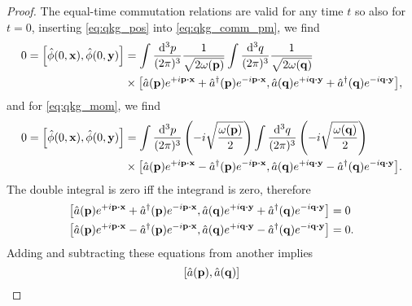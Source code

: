 \qkgcommac
\begin{proof}
	The equal-time commutation relations are valid for any time $t$ so also for $t=0$, inserting \cref{eq:qkg_pos} into \cref{eq:qkg_comm_pm}, we find
	\begin{equation*}
		\begin{split}
			0
			=
			\comm{\hat\phi(0,\vb{x})}{\hat\phi(0,\vb{y})}
			&=
			\int\frac{\dd[3]{p}}{(2\pi)^3}
			\frac{1}{\sqrt{2\omega(\vb{p})}}
			\int\frac{\dd[3]{q}}{(2\pi)^3}
			\frac{1}{\sqrt{2\omega(\vb{q})}}
			\\
			&\times
			\comm{
				\hat{a}(\vb{p})
				e^{+i\vb{p}\vdot\vb{x}}
				+
				\hat{a}^\dagger(\vb{p})
				e^{-i\vb{p}\vdot\vb{x}}
			}{
				\hat{a}(\vb{q})
				e^{+i\vb{q}\vdot\vb{y}}
				+
				\hat{a}^\dagger(\vb{q})
				e^{-i\vb{q}\vdot\vb{y}}
			}
			,
		\end{split}
	\end{equation*}
		and for \cref{eq:qkg_mom}, we find
	\begin{equation*}
		\begin{split}
			0
			=
			\comm{\hat\phi(0,\vb{x})}{\hat\phi(0,\vb{y})}
			&=
			\int\frac{\dd[3]{p}}{(2\pi)^3}
			\left(
				-i
				\sqrt{\frac{\omega(\vb{p})}{2}}
			\right)
			\int\frac{\dd[3]{q}}{(2\pi)^3}
			\left(
				-i
				\sqrt{\frac{\omega(\vb{q})}{2}}
			\right)
			\\
			&\times
			\comm{
				\hat{a}(\vb{p})
				e^{+i\vb{p}\vdot\vb{x}}
				-
				\hat{a}^\dagger(\vb{p})
				e^{-i\vb{p}\vdot\vb{x}}
			}{
				\hat{a}(\vb{q})
				e^{+i\vb{q}\vdot\vb{y}}
				-
				\hat{a}^\dagger(\vb{q})
				e^{-i\vb{q}\vdot\vb{y}}
			}
			.
		\end{split}
	\end{equation*}
	The double integral is zero iff the integrand is zero, therefore
	\begin{align*}
		\comm{
			\hat{a}(\vb{p})
			e^{+i\vb{p}\vdot\vb{x}}
			+
			\hat{a}^\dagger(\vb{p})
			e^{-i\vb{p}\vdot\vb{x}}
		}{
			\hat{a}(\vb{q})
			e^{+i\vb{q}\vdot\vb{y}}
			+
			\hat{a}^\dagger(\vb{q})
			e^{-i\vb{q}\vdot\vb{y}}
		}
		&=
		0
		\\
		\comm{
			\hat{a}(\vb{p})
			e^{+i\vb{p}\vdot\vb{x}}
			-
			\hat{a}^\dagger(\vb{p})
			e^{-i\vb{p}\vdot\vb{x}}
		}{
			\hat{a}(\vb{q})
			e^{+i\vb{q}\vdot\vb{y}}
			-
			\hat{a}^\dagger(\vb{q})
			e^{-i\vb{q}\vdot\vb{y}}
		}
		&=
		0
		.
	\end{align*}
	Adding and subtracting these equations from another implies
	\begin{equation*}
		\comm{\hat{a}(\vb{p})}{\hat{a}(\vb{q})}

\end{equation*}
\end{proof}
